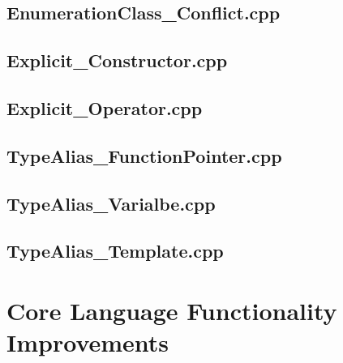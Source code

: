 \documentclass[11pt]{report}
\newcommand{\Cpp}{\lstset{language=C++,keywordstyle=\bfseries,breaklines,breakindent=30pt}}
\begin{document}
\begin{appendix}
\subsection{EnumerationClass\_Conflict.cpp}
\label{EnumerationClass_Conflict}


\subsection{Explicit\_Constructor.cpp}
\label{Explicit_Constructor}


\subsection{Explicit\_Operator.cpp}
\label{Explicit_Operator}


\subsection{TypeAlias\_FunctionPointer.cpp}
\label{TypeAlias_FunctionPointer}


\subsection{TypeAlias\_Varialbe.cpp}
\label{TypeAlias_Varialbe}


\subsection{TypeAlias\_Template.cpp}
\label{TypeAlias_Template}




\section{Core Language Functionality Improvements}
\label{Appendix: corelanguage functionality improvements}

\Cpp


\end{appendix}
\end{document}
